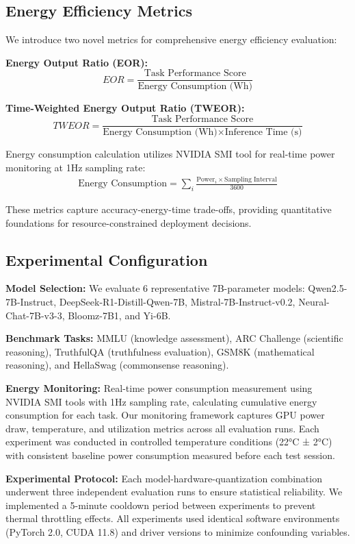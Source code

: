 \documentclass[sigconf,review]{acmart}
\begin{document}
\subsection{Energy Efficiency Metrics}

We introduce two novel metrics for comprehensive energy efficiency evaluation:

\textbf{Energy Output Ratio (EOR):}
$$EOR = \frac{\text{Task Performance Score}}{\text{Energy Consumption (Wh)}}$$

\textbf{Time-Weighted Energy Output Ratio (TWEOR):}
$$TWEOR = \frac{\text{Task Performance Score}}{\text{Energy Consumption (Wh)} \times \text{Inference Time (s)}}$$

Energy consumption calculation utilizes NVIDIA SMI tool for real-time power monitoring at 1Hz sampling rate:
\begin{align}
\text{Energy Consumption} = \sum_i \frac{\text{Power}_i \times \text{Sampling Interval}}{3600}
\end{align}

These metrics capture accuracy-energy-time trade-offs, providing quantitative foundations for resource-constrained deployment decisions.

\subsection{Experimental Configuration}

\textbf{Model Selection:} We evaluate 6 representative 7B-parameter models: Qwen2.5-7B-Instruct, DeepSeek-R1-Distill-Qwen-7B, Mistral-7B-Instruct-v0.2, Neural-Chat-7B-v3-3, Bloomz-7B1, and Yi-6B.

\textbf{Benchmark Tasks:} MMLU (knowledge assessment), ARC Challenge (scientific reasoning), TruthfulQA (truthfulness evaluation), GSM8K (mathematical reasoning), and HellaSwag (commonsense reasoning).

\textbf{Energy Monitoring:} Real-time power consumption measurement using NVIDIA SMI tools with 1Hz sampling rate, calculating cumulative energy consumption for each task. Our monitoring framework captures GPU power draw, temperature, and utilization metrics across all evaluation runs. Each experiment was conducted in controlled temperature conditions (22°C ± 2°C) with consistent baseline power consumption measured before each test session.

\textbf{Experimental Protocol:} Each model-hardware-quantization combination underwent three independent evaluation runs to ensure statistical reliability. We implemented a 5-minute cooldown period between experiments to prevent thermal throttling effects. All experiments used identical software environments (PyTorch 2.0, CUDA 11.8) and driver versions to minimize confounding variables.
\end{document}
